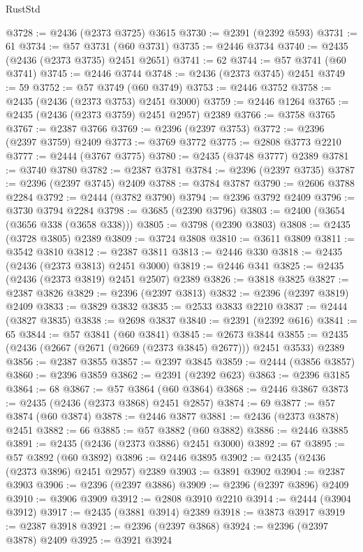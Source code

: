 \begin{lexlean}{RustStd}
\begin{coremodule}
@3728 := @2436 (@2373 @3725) @3615
@3730 := @2391 (@2392 @593)
@3731 := 61
@3734 := @57 @3731 (@60 @3731)
@3735 := @2446 @3734
@3740 := @2435 (@2436 (@2373 @3735) @2451 @2651)
@3741 := 62
@3744 := @57 @3741 (@60 @3741)
@3745 := @2446 @3744
@3748 := @2436 (@2373 @3745) @2451
@3749 := 59
@3752 := @57 @3749 (@60 @3749)
@3753 := @2446 @3752
@3758 := @2435 (@2436 (@2373 @3753) @2451 @3000)
@3759 := @2446 @1264
@3765 := @2435 (@2436 (@2373 @3759) @2451 @2957) @2389
@3766 := @3758 @3765
@3767 := @2387 @3766
@3769 := @2396 (@2397 @3753)
@3772 := @2396 (@2397 @3759) @2409
@3773 := @3769 @3772
@3775 := @2808 @3773 @2210
@3777 := @2444 (@3767 @3775)
@3780 := @2435 (@3748 @3777) @2389
@3781 := @3740 @3780
@3782 := @2387 @3781
@3784 := @2396 (@2397 @3735)
@3787 := @2396 (@2397 @3745) @2409
@3788 := @3784 @3787
@3790 := @2606 @3788 @2284
@3792 := @2444 (@3782 @3790)
@3794 := @2396 @3792 @2409
@3796 := @3730 @3794 @2284
@3798 := @3685 (@2390 @3796)
@3803 := @2400 (@3654 (@3656 @338 (@3658 @338)))
@3805 := @3798 (@2390 @3803)
@3808 := @2435 (@3728 @3805) @2389
@3809 := @3724 @3808
@3810 := @3611 @3809
@3811 := @3542 @3810
@3812 := @2387 @3811
@3813 := @2446 @330
@3818 := @2435 (@2436 (@2373 @3813) @2451 @3000)
@3819 := @2446 @341
@3825 := @2435 (@2436 (@2373 @3819) @2451 @2507) @2389
@3826 := @3818 @3825
@3827 := @2387 @3826
@3829 := @2396 (@2397 @3813)
@3832 := @2396 (@2397 @3819) @2409
@3833 := @3829 @3832
@3835 := @2533 @3833 @2210
@3837 := @2444 (@3827 @3835)
@3838 := @2698 @3837
@3840 := @2391 (@2392 @616)
@3841 := 65
@3844 := @57 @3841 (@60 @3841)
@3845 := @2673 @3844
@3855 := @2435 (@2436 (@2667 (@2671 (@2669 (@2373 @3845) @2677))) @2451 @3533) @2389
@3856 := @2387 @3855
@3857 := @2397 @3845
@3859 := @2444 (@3856 @3857)
@3860 := @2396 @3859
@3862 := @2391 (@2392 @623)
@3863 := @2396 @3185
@3864 := 68
@3867 := @57 @3864 (@60 @3864)
@3868 := @2446 @3867
@3873 := @2435 (@2436 (@2373 @3868) @2451 @2857)
@3874 := 69
@3877 := @57 @3874 (@60 @3874)
@3878 := @2446 @3877
@3881 := @2436 (@2373 @3878) @2451
@3882 := 66
@3885 := @57 @3882 (@60 @3882)
@3886 := @2446 @3885
@3891 := @2435 (@2436 (@2373 @3886) @2451 @3000)
@3892 := 67
@3895 := @57 @3892 (@60 @3892)
@3896 := @2446 @3895
@3902 := @2435 (@2436 (@2373 @3896) @2451 @2957) @2389
@3903 := @3891 @3902
@3904 := @2387 @3903
@3906 := @2396 (@2397 @3886)
@3909 := @2396 (@2397 @3896) @2409
@3910 := @3906 @3909
@3912 := @2808 @3910 @2210
@3914 := @2444 (@3904 @3912)
@3917 := @2435 (@3881 @3914) @2389
@3918 := @3873 @3917
@3919 := @2387 @3918
@3921 := @2396 (@2397 @3868)
@3924 := @2396 (@2397 @3878) @2409
@3925 := @3921 @3924

\end{coremodule}
\end{lexlean}

